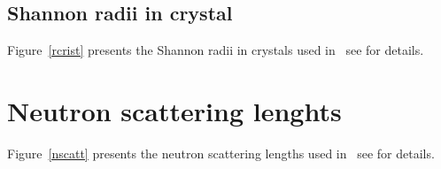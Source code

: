 \clearpage
\subsection{Shannon radii in crystal}

\noindent Figure~\ref{rcrist} presents the Shannon radii in crystals used in \atomes\ see \cite{ActaCrystB.25.925, ActaCrystA.23.751} for details. 

\section{Neutron scattering lenghts}

\noindent Figure~\ref{nscatt} presents the neutron scattering lengths used in \atomes\ see \cite{n-lgths, NeutronNews.3.26} for details.
